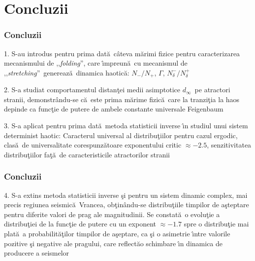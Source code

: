 \documentclass[a4,compress,handout]{beamer}
\newcommand{\ab}{\u{a}}
\newcommand{\ac}{\^{a}}
\newcommand{\ib}{\^{\i}}
\newcommand{\tb}{\c{t}}
\newcommand{\st}{\c{s}}
\newcommand{\fol}{,,\textit{folding}''}
\newcommand{\str}{,,\textit{stretching}''}
\newcommand{\nn}{$N_-/N_+$}
\newcommand{\dinf}{$d_\infty$}
\begin{document}

\section[Concluzii]{Concluzii \hspace{43cm}}
\begin{frame}\frametitle{Concluzii}

\begin{itemize}
	
	{\footnotesize
	\item 1. S-au introdus pentru prima dat\ab\ c\ac teva m\ab rimi fizice pentru caracterizarea mecanismului de \fol, care \ib mpreun\ab\ cu mecanismul de \str\ genereaz\ab\ dinamica haotic\ab: \nn, $\Gamma$, $N^-_\delta/N^+_\delta$
	
	}
\end{itemize}

\begin{itemize}
	
	{\footnotesize
		
		\item 2. S-a studiat comportamentul distan\tb ei medii asimptotice \dinf\ pe atractori stranii, demonstr\ac ndu-se c\ab\ este prima m\ab rime fizic\ab\ care la tranzi\tb ia la haos depinde ca func\tb ie de putere de ambele constante universale Feigenbaum
		\item 3. S-a aplicat pentru prima dat\ab\ metoda statisticii inverse \ib n studiul unui sistem determinist haotic: Caracterul universal al distribu\tb iilor pentru cazul ergodic, clas\ab\ de universalitate corespunz\ab toare exponentului critic $\approx-2.5$, senzitivitatea distribu\tb iilor fa\tb \ab\ de caracteristicile atractorilor stranii
	}
\end{itemize}

\end{frame}

\begin{frame}\frametitle{Concluzii}
	
		
	\begin{itemize}
		
		{\footnotesize
			
			\item 4. S-a extins metoda statisticii inverse \st i pentru un sistem dinamic complex, mai precis regiunea seismic\ab\ Vrancea, ob\tb in\ac ndu-se distribu\tb iile timpilor de a\st teptare pentru diferite valori de prag ale magnitudinii. Se constat\ab\ o evolu\tb ie a distribu\tb iei de la func\tb ie de putere cu un exponent $\approx-1.7$ spre o distribu\tb ie mai plat\ab\ a probabilit\ab \tb ilor timpilor de a\st eptare, ca \st i o asimetrie \ib ntre valorile pozitive \st i negative ale pragului, care reflect\ab o schimbare \ib n dinamica de producere a seismelor
		}
	\end{itemize}
	
\end{frame}
\end{document}
